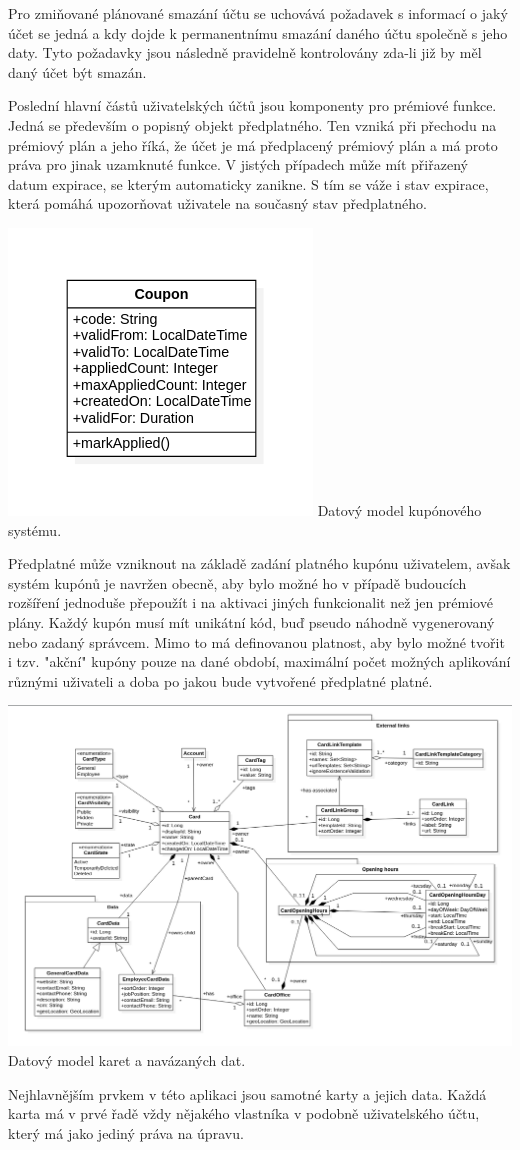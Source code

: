 		Pro zmiňované plánované smazání účtu se uchovává požadavek s informací o jaký účet se jedná a kdy dojde k permanentnímu
		smazání daného účtu společně s jeho daty.
		Tyto požadavky jsou následně pravidelně kontrolovány zda-li již by měl daný účet být smazán.

		Poslední hlavní částů uživatelských účtů jsou komponenty pro prémiové funkce.
		Jedná se především o popisný objekt předplatného.
		Ten vzniká při přechodu na prémiový plán a jeho říká, že účet je má předplacený prémiový plán a má proto práva pro
		jinak uzamknuté funkce.
		V jistých případech může mít přiřazený datum expirace, se kterým automaticky zanikne.
		S tím se váže i stav expirace, která pomáhá upozorňovat uživatele na současný stav předplatného.

		\includegraphics[width=0.24\linewidth]{obrazky/datovy_model_kupon}\hfill
		Datový model kupónového systému. %

		Předplatné může vzniknout na základě zadání platného kupónu uživatelem, avšak systém kupónů je navržen obecně, aby
		bylo možné ho v případě budoucích rozšíření jednoduše přepoužít i na aktivaci jiných funkcionalit než jen
		prémiové plány.
		Každý kupón musí mít unikátní kód, buď pseudo náhodně vygenerovaný nebo zadaný správcem.
		Mimo to má definovanou platnost, aby bylo možné tvořit i tzv. "akční" kupóny pouze na dané období, maximální počet
		možných aplikování různými uživateli a doba po jakou bude vytvořené předplatné platné.

		\includegraphics[width=0.24\linewidth]{obrazky/datovy_model_karta}\hfill
		Datový model karet a navázaných dat. %

		Nejhlavnějším prvkem v této aplikaci jsou samotné karty a jejich data.
		Každá karta má v prvé řadě vždy nějakého vlastníka v podobně uživatelského účtu, který má jako jediný práva na
		úpravu.

